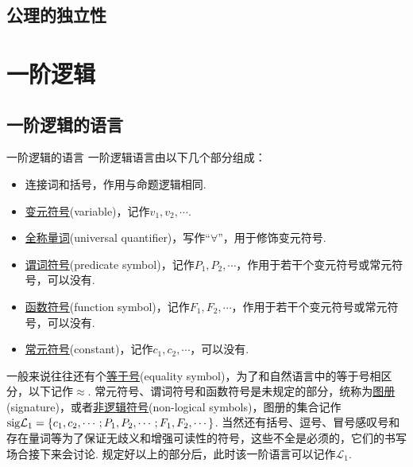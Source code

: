 \subsection{公理的独立性}

\section{一阶逻辑}

\subsection{一阶逻辑的语言}

\begin{definition}{一阶逻辑的语言}
    一阶逻辑语言由以下几个部分组成：
    \begin{itemize}
        \item 连接词和括号，作用与命题逻辑相同.
        \item \underline{变元符号}(variable)，记作\(v_1, v_2, \cdots\).
        \item \underline{全称量词}(universal quantifier)，写作“\(\forall\)”，用于修饰变元符号.
        \item \underline{谓词符号}(predicate symbol)，记作\(P_1,P_2,\cdots\)，作用于若干个变元符号或常元符号，可以没有.
        \item \underline{函数符号}(function symbol)，记作\(F_1,F_2,\cdots\)，作用于若干个变元符号或常元符号，可以没有.
        \item \underline{常元符号}(constant)，记作\(c_1,c_2,\cdots\)，可以没有.
    \end{itemize}
    一般来说往往还有个\underline{等于号}(equality symbol)，为了和自然语言中的等于号相区分，以下记作\(\approx\). \newline
    常元符号、谓词符号和函数符号是未规定的部分，统称为\underline{图册}(signature)，或者\underline{非逻辑符号}(non-logical symbols)，图册的集合记作\({\rm sig}\mathcal{L}_1 = \{ c_1, c_2, \cdots; P_1, P_2, \cdots; F_1, F_2, \cdots \}\). \newline
    当然还有括号、逗号、冒号感叹号和存在量词等为了保证无歧义和增强可读性的符号，这些不全是必须的，它们的书写场合接下来会讨论. \newline
    规定好以上的部分后，此时该一阶语言可以记作\(\mathcal{L}_1\).
\end{definition}

